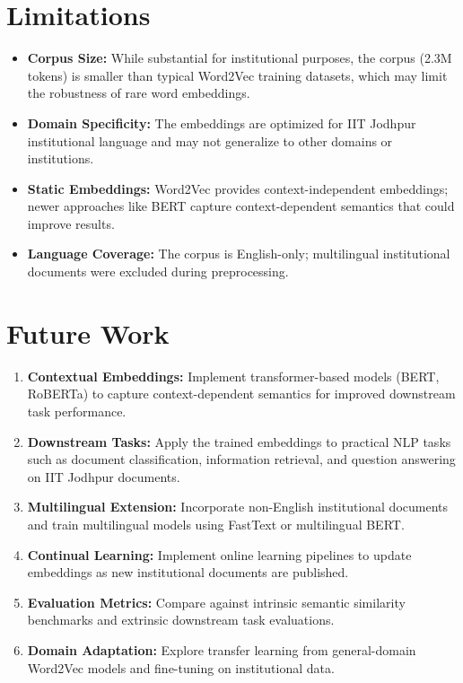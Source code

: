 \documentclass[11pt,a4paper]{report}
\begin{document}
\section{Limitations}

\begin{itemize}
    \item \textbf{Corpus Size:} While substantial for institutional purposes, the corpus (2.3M tokens) is smaller than typical Word2Vec training datasets, which may limit the robustness of rare word embeddings.
    
    \item \textbf{Domain Specificity:} The embeddings are optimized for IIT Jodhpur institutional language and may not generalize to other domains or institutions.
    
    \item \textbf{Static Embeddings:} Word2Vec provides context-independent embeddings; newer approaches like BERT capture context-dependent semantics that could improve results.
    
    \item \textbf{Language Coverage:} The corpus is English-only; multilingual institutional documents were excluded during preprocessing.
\end{itemize}

\section{Future Work}

\begin{enumerate}
    \item \textbf{Contextual Embeddings:} Implement transformer-based models (BERT, RoBERTa) to capture context-dependent semantics for improved downstream task performance.
    
    \item \textbf{Downstream Tasks:} Apply the trained embeddings to practical NLP tasks such as document classification, information retrieval, and question answering on IIT Jodhpur documents.
    
    \item \textbf{Multilingual Extension:} Incorporate non-English institutional documents and train multilingual models using FastText or multilingual BERT.
    
    \item \textbf{Continual Learning:} Implement online learning pipelines to update embeddings as new institutional documents are published.
    
    \item \textbf{Evaluation Metrics:} Compare against intrinsic semantic similarity benchmarks and extrinsic downstream task evaluations.
    
    \item \textbf{Domain Adaptation:} Explore transfer learning from general-domain Word2Vec models and fine-tuning on institutional data.
\end{enumerate}
\end{document}
